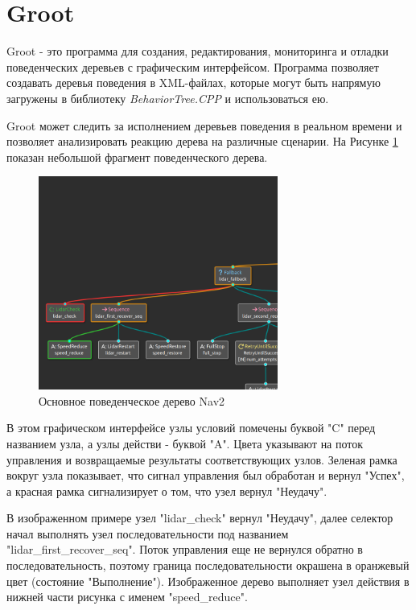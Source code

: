 \section{Groot}
Groot - это программа для создания, редактирования, мониторинга и отладки поведенческих деревьев с графическим интерфейсом. Программа позволяет создавать деревья поведения в XML-файлах, которые могут быть напрямую загружены в библиотеку \textit{BehaviorTree.CPP} и использоваться ею. 

Groot может следить за исполнением деревьев поведения в реальном времени и позволяет анализировать реакцию дерева на различные сценарии. На Рисунке \ref*{fig:groot-example} показан небольшой фрагмент поведенческого дерева.

\begin{figure}[h]
    \centering
    \includegraphics[width=0.7\textwidth]{images/chap_2/groot-example.png}
    \caption{Основное поведенческое дерево Nav2}
    \label{fig:groot-example}
\end{figure}

В этом графическом интерфейсе узлы условий помечены буквой "C" перед названием узла, а узлы действи - буквой "A". Цвета указывают на поток управления и возвращаемые результаты соответствующих узлов. Зеленая рамка вокруг узла показывает, что сигнал управления был обработан и вернул "Успех", а красная рамка сигнализирует о том, что узел вернул "Неудачу". 

В изображенном примере узел "lidar\_check" вернул "Неудачу", далее селектор начал выполнять узел последовательности под названием "lidar\_first\_recover\_seq". Поток управления еще не вернулся обратно в последовательность, поэтому граница последовательности окрашена в оранжевый цвет (состояние "Выполнение"). Изображенное дерево выполняет узел действия в нижней части рисунка с именем "speed\_reduce".

